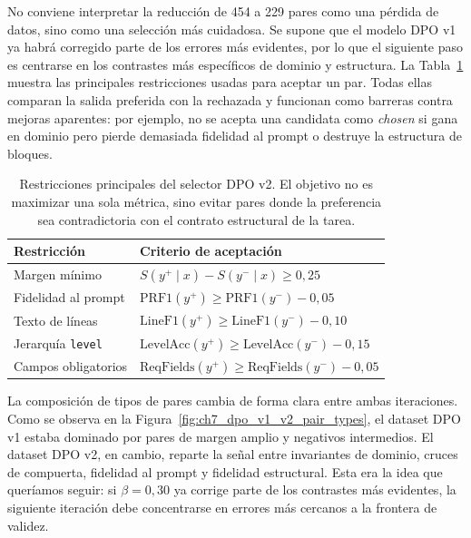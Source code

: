 No conviene interpretar la reducción de 454 a 229 pares como una pérdida de datos, sino como una selección más
cuidadosa. Se supone que el modelo DPO v1 ya habrá corregido parte de los errores más evidentes, por lo que el
siguiente paso es centrarse en los contrastes más específicos de dominio y estructura. La
Tabla~\ref{tab:ch7_dpo_v2_guardrails} muestra las principales restricciones usadas para aceptar un
par. Todas ellas comparan la salida preferida con la rechazada y funcionan como barreras contra
mejoras aparentes: por ejemplo, no se acepta una candidata como \textit{chosen} si gana en dominio
pero pierde demasiada fidelidad al prompt o destruye la estructura de bloques.

\begin{table}[htbp]
\centering
\caption{Restricciones principales del selector DPO v2. El objetivo no es maximizar una sola métrica,
         sino evitar pares donde la preferencia sea contradictoria con el contrato estructural de la
         tarea.}
\label{tab:ch7_dpo_v2_guardrails}
\small
\begin{tabularx}{\textwidth}{lX}
\toprule
\textbf{Restricción} & \textbf{Criterio de aceptación} \\
\midrule
Margen mínimo & \(S(y^+ \mid x)-S(y^- \mid x) \geq 0{,}25\) \\
Fidelidad al prompt & \(\mathrm{PRF1}(y^+) \geq \mathrm{PRF1}(y^-) - 0{,}05\) \\
Texto de líneas & \(\mathrm{LineF1}(y^+) \geq \mathrm{LineF1}(y^-) - 0{,}10\) \\
Jerarquía \texttt{level} & \(\mathrm{LevelAcc}(y^+) \geq \mathrm{LevelAcc}(y^-) - 0{,}15\) \\
Campos obligatorios & \(\mathrm{ReqFields}(y^+) \geq \mathrm{ReqFields}(y^-) - 0{,}05\) \\
\bottomrule
\end{tabularx}
\end{table}

La composición de tipos de pares cambia de forma clara entre ambas iteraciones. Como se observa en la
Figura~\ref{fig:ch7_dpo_v1_v2_pair_types}, el dataset DPO v1 estaba dominado por pares de margen amplio y
negativos intermedios. El dataset DPO v2, en cambio, reparte la señal entre invariantes de dominio, cruces de
compuerta, fidelidad al prompt y fidelidad estructural. Esta era la idea que queríamos seguir: 
si \(\beta=0{,}30\) ya corrige parte de los contrastes más evidentes, la siguiente
iteración debe concentrarse en errores más cercanos a la frontera de validez.

